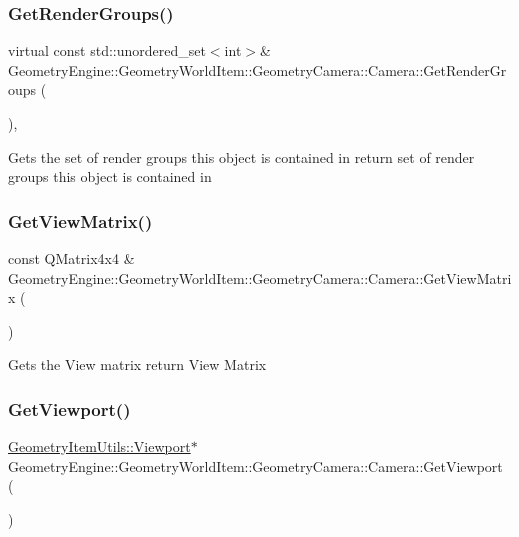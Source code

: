 \subsubsection{\texorpdfstring{GetRenderGroups()}{GetRenderGroups()}}
{\footnotesize\ttfamily virtual const std\+::unordered\+\_\+set$<$int$>$\& Geometry\+Engine\+::\+Geometry\+World\+Item\+::\+Geometry\+Camera\+::\+Camera\+::\+Get\+Render\+Groups (\begin{DoxyParamCaption}{ }\end{DoxyParamCaption})\hspace{0.3cm}{\ttfamily [inline]}, {\ttfamily [virtual]}}

Gets the set of render groups this object is contained in return set of render groups this object is contained in \mbox{\label{class_geometry_engine_1_1_geometry_world_item_1_1_geometry_camera_1_1_camera_a140ec366f6b9b9df8ed9134c612cbac6}} 
\subsubsection{\texorpdfstring{GetViewMatrix()}{GetViewMatrix()}}
{\footnotesize\ttfamily const Q\+Matrix4x4 \& Geometry\+Engine\+::\+Geometry\+World\+Item\+::\+Geometry\+Camera\+::\+Camera\+::\+Get\+View\+Matrix (\begin{DoxyParamCaption}{ }\end{DoxyParamCaption})\hspace{0.3cm}{\ttfamily [virtual]}}

Gets the View matrix return View Matrix \mbox{\label{class_geometry_engine_1_1_geometry_world_item_1_1_geometry_camera_1_1_camera_af0cbe2d79ec50e1ecdec1e81be08163e}} 
\subsubsection{\texorpdfstring{GetViewport()}{GetViewport()}}
{\footnotesize\ttfamily \mbox{\hyperlink{class_geometry_engine_1_1_geometry_item_utils_1_1_viewport}{Geometry\+Item\+Utils\+::\+Viewport}}$\ast$ Geometry\+Engine\+::\+Geometry\+World\+Item\+::\+Geometry\+Camera\+::\+Camera\+::\+Get\+Viewport (\begin{DoxyParamCaption}{ }\end{DoxyParamCaption})\hspace{0.3cm}{\ttfamily [inline]}}

